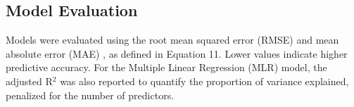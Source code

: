 \documentclass[10pt,letterpaper]{article}
\begin{document}
%
%

\subsection{Model Evaluation}
Models were evaluated using the root mean squared error (RMSE) and mean absolute error (MAE) \cite{hodson2022root}, as defined in Equation 11. Lower values indicate higher predictive accuracy. For the Multiple Linear Regression (MLR) model, the adjusted R$^2$ was also reported to quantify the proportion of variance explained, penalized for the number of predictors.
\end{document}

